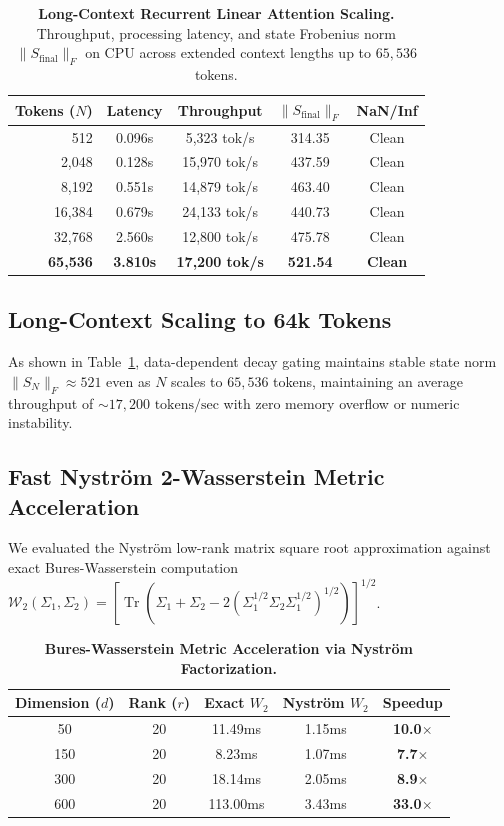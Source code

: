 \documentclass[10pt,twocolumn,letterpaper]{article}
\begin{document}
\begin{table}[t]
\centering
\small
\caption{\textbf{Long-Context Recurrent Linear Attention Scaling.} Throughput, processing latency, and state Frobenius norm $\|S_{\text{final}}\|_F$ on CPU across extended context lengths up to $65,536$ tokens.}
\label{tab:long_context_scaling}
\begin{tabularx}{\columnwidth}{rcccc}
\toprule
\textbf{Tokens ($N$)} & \textbf{Latency} & \textbf{Throughput} & \textbf{$\|S_{\text{final}}\|_F$} & \textbf{NaN/Inf} \\
\midrule
512    & 0.096s & 5,323 tok/s  & 314.35 & Clean \\
2,048  & 0.128s & 15,970 tok/s & 437.59 & Clean \\
8,192  & 0.551s & 14,879 tok/s & 463.40 & Clean \\
16,384 & 0.679s & 24,133 tok/s & 440.73 & Clean \\
32,768 & 2.560s & 12,800 tok/s & 475.78 & Clean \\
\textbf{65,536} & \textbf{3.810s} & \textbf{17,200 tok/s} & \textbf{521.54} & \textbf{Clean} \\
\bottomrule
\end{tabularx}
\end{table}

\subsection{Long-Context Scaling to 64k Tokens}
As shown in Table~\ref{tab:long_context_scaling}, data-dependent decay gating maintains stable state norm $\|S_N\|_F \approx 521$ even as $N$ scales to $65,536$ tokens, maintaining an average throughput of $\sim 17,200\text{ tokens/sec}$ with zero memory overflow or numeric instability.

\subsection{Fast Nystr\"om 2-Wasserstein Metric Acceleration}
We evaluated the Nystr\"om low-rank matrix square root approximation against exact Bures-Wasserstein computation $\mathcal{W}_2(\Sigma_1, \Sigma_2) = \left[\operatorname{Tr}(\Sigma_1 + \Sigma_2 - 2(\Sigma_1^{1/2} \Sigma_2 \Sigma_1^{1/2})^{1/2})\right]^{1/2}$.

\begin{table}[h]
\centering
\small
\caption{\textbf{Bures-Wasserstein Metric Acceleration via Nystr\"om Factorization.}}
\label{tab:nystrom_w2}
\begin{tabularx}{\columnwidth}{ccccc}
\toprule
\textbf{Dimension ($d$)} & \textbf{Rank ($r$)} & \textbf{Exact $W_2$} & \textbf{Nystr\"om $W_2$} & \textbf{Speedup} \\
\midrule
50  & 20 & 11.49ms  & 1.15ms & \textbf{10.0$\times$} \\
150 & 20 & 8.23ms   & 1.07ms & \textbf{7.7$\times$} \\
300 & 20 & 18.14ms  & 2.05ms & \textbf{8.9$\times$} \\
600 & 20 & 113.00ms & 3.43ms & \textbf{33.0$\times$} \\
\bottomrule
\end{tabularx}
\end{table}
\end{document}
